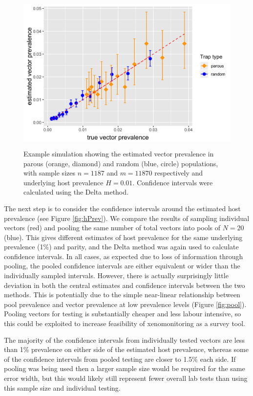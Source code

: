 \begin{figure}[h]
\begin{center}
\includegraphics[height=8cm]{Project/Figures/Xeno/VPrevEst.png}
\end{center}
\caption{Example simulation showing the estimated vector prevalence in parous (orange, diamond) and random (blue, circle) populations, with sample sizes $n=1187$ and $m=11870$ respectively and underlying host prevalence $H=0.01$. Confidence intervals were calculated using the Delta method.}
\label{fig:vPrev}
\end{figure}

The next step is to consider the confidence intervals around the estimated host prevalence (see Figure \ref{fig:hPrev}). We compare the results of sampling individual vectors (red) and pooling the same number of total vectors into pools of $N=20$ (blue). This gives different estimates of host prevalence for the same underlying prevalence (1\%) and parity, and the Delta method was again used to calculate confidence intervals. In all cases, as expected due to loss of information through pooling, the pooled confidence intervals are either equivalent or wider than the individually sampled intervals. However, there is actually surprisingly little deviation in both the central estimates and confidence intervals between the two methods. This is potentially due to the simple near-linear relationship between pool prevalence and vector prevalence at low prevalence levels (Figure \ref{fig:pool}). Pooling vectors for testing is substantially cheaper and less labour intensive, so this could be exploited to increase feasibility of xenomonitoring as a survey tool.

The majority of the confidence intervals from individually tested vectors are less than 1\% prevalence on either side of the estimated host prevalence, whereas some of the confidence intervals from pooled testing are closer to 1.5\% each side. If pooling was being used then a larger sample size would be required for the same error width, but this would likely still represent fewer overall lab tests than using this sample size and individual testing.

